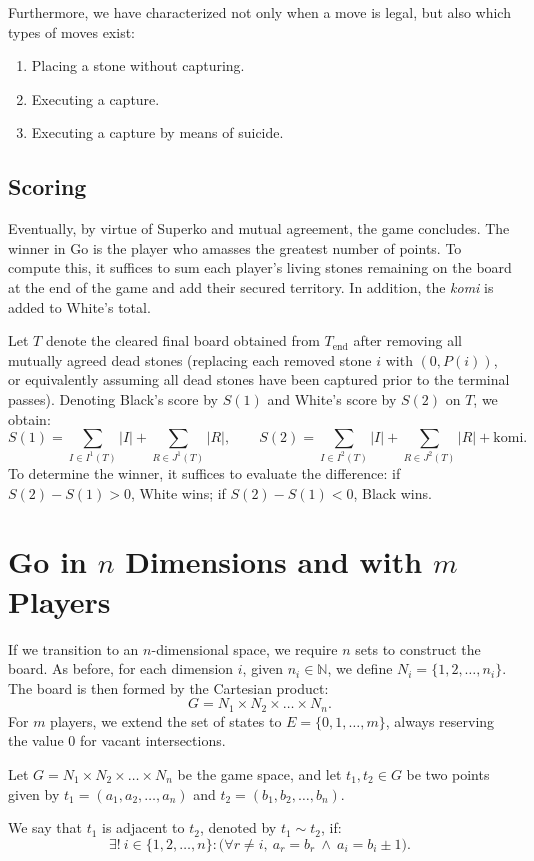 Furthermore, we have characterized not only when a move is legal, but also which types of moves exist:
\begin{enumerate}
	\item Placing a stone without capturing.
	\item Executing a capture.
	\item Executing a capture by means of suicide.
\end{enumerate}

\subsection{Scoring}\label{contarpuntos}
Eventually, by virtue of Superko and mutual agreement, the game concludes. The winner in Go is the player who amasses the greatest number of points. To compute this, it suffices to sum each player's living stones remaining on the board at the end of the game and add their secured territory. In addition, the \textit{komi} is added to White's total.

Let $T$ denote the cleared final board obtained from $T_{\text{end}}$ after removing all
mutually agreed dead stones (replacing each removed stone $i$ with $(0, P(i))$, or
equivalently assuming all dead stones have been captured prior to the terminal passes).
Denoting Black's score by $S(1)$ and White's score by $S(2)$ on $T$, we obtain:
\[
S(1) = \sum_{I \in I^1(T)} |I| + \sum_{R \in J^1(T)} |R|,
\qquad
S(2) = \sum_{I \in I^2(T)} |I| + \sum_{R \in J^2(T)} |R| + \text{komi}.
\]
To determine the winner, it suffices to evaluate the difference: if $S(2) - S(1) > 0$, White wins; if $S(2) - S(1) < 0$, Black wins.

\section{Go in \texorpdfstring{$n$}{n} Dimensions and with \texorpdfstring{$m$}{m} Players}\label{Go_n_m}

If we transition to an $n$-dimensional space, we require $n$ sets to construct the board. As before, for each dimension $i$, given $n_i \in \mathbb{N}$, we define $N_i = \{1, 2, \dots, n_i\}$. The board is then formed by the Cartesian product:
\[ G = N_1 \times N_2 \times \dots \times N_n. \]
For $m$ players, we extend the set of states to $E = \{0, 1, \dots, m\}$, always reserving the value $0$ for vacant intersections.

\begin{definition}
	Let $G = N_1 \times N_2 \times \dots \times N_n$ be the game space, and let $t_1, t_2 \in G$ be two points given by $t_1 = (a_1, a_2, \dots, a_n)$ and $t_2 = (b_1, b_2, \dots, b_n)$.
	
	We say that $t_1$ is adjacent to $t_2$, denoted by $t_1 \sim t_2$, if:
	$$\exists! \ i \in \{1, 2, \dots, n\} : \big( \forall r \neq i, \ a_r = b_r \ \land \ a_i = b_i \pm 1 \big).$$
\end{definition}

